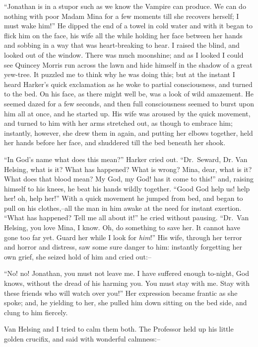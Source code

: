 \documentclass[12pt,openright]{book}
\begin{document}
“Jonathan is in a stupor such as we know the Vampire can produce. We can do nothing with poor Madam Mina for a few moments till she recovers herself; I must wake him!” He dipped the end of a towel in cold water and with it began to flick him on the face, his wife all the while holding her face between her hands and sobbing in a way that was heart-breaking to hear. I raised the blind, and looked out of the window. There was much moonshine; and as I looked I could see Quincey Morris run across the lawn and hide himself in the shadow of a great yew-tree. It puzzled me to think why he was doing this; but at the instant I heard Harker’s quick exclamation as he woke to partial consciousness, and turned to the bed. On his face, as there might well be, was a look of wild amazement. He seemed dazed for a few seconds, and then full consciousness seemed to burst upon him all at once, and he started up. His wife was aroused by the quick movement, and turned to him with her arms stretched out, as though to embrace him; instantly, however, she drew them in again, and putting her elbows together, held her hands before her face, and shuddered till the bed beneath her shook.

“In God’s name what does this mean?” Harker cried out. “Dr. Seward, Dr. Van Helsing, what is it? What has happened? What is wrong? Mina, dear, what is it? What does that blood mean? My God, my God! has it come to this!” and, raising himself to his knees, he beat his hands wildly together. “Good God help us! help her! oh, help her!” With a quick movement he jumped from bed, and began to pull on his clothes,–all the man in him awake at the need for instant exertion. “What has happened? Tell me all about it!” he cried without pausing. “Dr. Van Helsing, you love Mina, I know. Oh, do something to save her. It cannot have gone too far yet. Guard her while I look for \textit{him}!” His wife, through her terror and horror and distress, saw some sure danger to him: instantly forgetting her own grief, she seized hold of him and cried out:–

“No! no! Jonathan, you must not leave me. I have suffered enough to-night, God knows, without the dread of his harming you. You must stay with me. Stay with these friends who will watch over you!” Her expression became frantic as she spoke; and, he yielding to her, she pulled him down sitting on the bed side, and clung to him fiercely.

Van Helsing and I tried to calm them both. The Professor held up his little golden crucifix, and said with wonderful calmness:–
\end{document}
